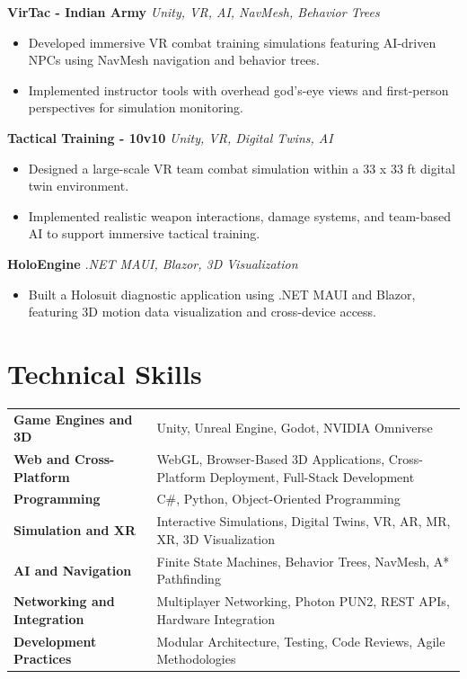 \documentclass[a4paper,10pt]{article}
\begin{document}
\textbf{VirTac - Indian Army}
\hfill \textit{Unity, VR, AI, NavMesh, Behavior Trees}
\begin{itemize}
    \item Developed immersive VR combat training simulations featuring
    AI-driven NPCs using NavMesh navigation and behavior trees.
    \item Implemented instructor tools with overhead god's-eye
    views and first-person perspectives for simulation monitoring.
\end{itemize}

\textbf{Tactical Training - 10v10}
\hfill \textit{Unity, VR, Digital Twins, AI}
\begin{itemize}
    \item Designed a large-scale VR team combat simulation within a
    33 x 33 ft digital twin environment.
    \item Implemented realistic weapon interactions, damage systems,
    and team-based AI to support immersive tactical training.
\end{itemize}

\textbf{HoloEngine}
\hfill \textit{.NET MAUI, Blazor, 3D Visualization}
\begin{itemize}
    \item Built a Holosuit diagnostic application using .NET MAUI
    and Blazor, featuring 3D motion data visualization and
    cross-device access.
\end{itemize}



\section{Technical Skills}

\begin{tabularx}{\textwidth}{@{}>{\bfseries}l X@{}}
Game Engines and 3D &
Unity, Unreal Engine, Godot, NVIDIA Omniverse \\

Web and Cross-Platform &
WebGL, Browser-Based 3D Applications, Cross-Platform
Deployment, Full-Stack Development \\

Programming &
C\#, Python, Object-Oriented Programming \\

Simulation and XR &
Interactive Simulations, Digital Twins, VR, AR, MR, XR,
3D Visualization \\

AI and Navigation &
Finite State Machines, Behavior Trees, NavMesh, A* Pathfinding \\

Networking and Integration &
Multiplayer Networking, Photon PUN2, REST APIs,
Hardware Integration \\

Development Practices &
Modular Architecture, Testing, Code Reviews, Agile Methodologies
\end{tabularx}
\end{document}

